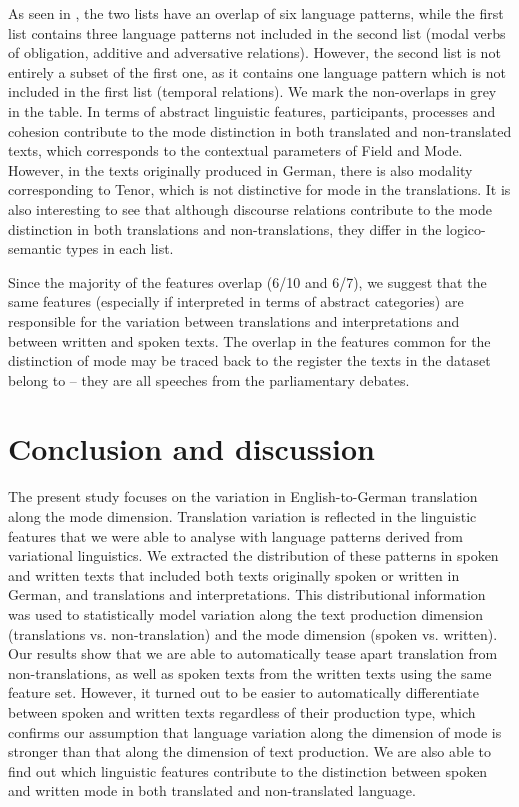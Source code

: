 \documentclass[output=paper,colorlinks,citecolor=brown]{langscibook}
\begin{document}
As seen in , the two lists have an overlap of six language patterns, while the first list contains three language patterns not included in the second list (modal verbs of obligation, additive and adversative relations). However, the second list is not entirely a subset of the first one, as it contains one language pattern which is not included in the first list (temporal relations). We mark the non-overlaps in grey in the table. In terms of abstract linguistic features, participants, processes and cohesion contribute to the mode distinction in both translated and non-translated texts, which corresponds to the contextual parameters of Field and Mode. However, in the texts originally produced in German, there is also modality corresponding to Tenor, which is not distinctive for mode in the translations. It is also interesting to see that although discourse relations contribute to the mode distinction in both translations and non-translations, they differ in the logico-semantic types in each list.

Since the majority of the features overlap (6/10 and 6/7), we suggest that the same features (especially if interpreted in terms of abstract categories) are responsible for the variation between translations and interpretations and between written and spoken texts. The overlap in the features common for the distinction of mode may be traced back to the register the texts in the dataset belong to -- they are all speeches from the parliamentary debates. 


\section{Conclusion and discussion}\label{sec:concdisc}

The present study focuses on the variation in English-to-German translation along the mode dimension. Translation variation is reflected in the linguistic features that we were able to analyse with language patterns derived from variational linguistics. We extracted the distribution of these patterns in spoken and written texts that included both texts originally spoken or written in German, and translations and interpretations. This distributional information was used to statistically model variation along the text production dimension (translations vs. non-translation) and the mode dimension (spoken vs. written). Our results show that we are able to automatically tease apart translation from non-translations, as well as spoken texts from the written texts using the same feature set. However, it turned out to be easier to automatically differentiate between spoken and written texts regardless of their production type, which confirms our assumption that language variation along the dimension of mode is stronger than that along the dimension of text production. We are also able to find out which linguistic features contribute to the distinction between spoken and written mode in both translated and non-translated language.
\end{document}
